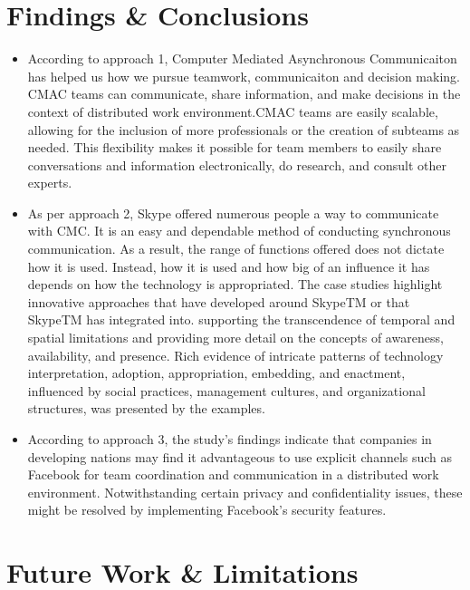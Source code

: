 \documentclass{llncs}
\begin{document}
\section{Findings \& Conclusions}

\begin{itemize}
    \item According to approach 1, Computer Mediated Asynchronous Communicaiton has helped us how we pursue teamwork, communicaiton and decision making. CMAC teams can communicate, share information, and make decisions in the context of distributed work environment.CMAC teams are easily scalable, allowing for the inclusion of more professionals or the creation of subteams as needed. This flexibility makes it possible for team members to easily share conversations and information electronically, do research, and consult other experts. ~\cite{refpaper5}\\
    \item As per approach 2, Skype offered numerous people a way to communicate with CMC. It is an easy and dependable method of conducting synchronous communication. As a result, the range of functions offered does not dictate how it is used. Instead, how it is used and how big of an influence it has depends on how the technology is appropriated. The case studies highlight innovative approaches that have developed around SkypeTM or that SkypeTM has integrated into. supporting the transcendence of temporal and spatial limitations and providing more detail on the concepts of awareness, availability, and presence. Rich evidence of intricate patterns of technology interpretation, adoption, appropriation, embedding, and enactment, influenced by social practices, management cultures, and organizational structures, was presented by the examples. ~\cite{refpaper7}\\
    \item According to approach 3, the study's findings indicate that companies in developing nations may find it advantageous to use explicit channels such as Facebook for team coordination and communication in a distributed work environment. Notwithstanding certain privacy and confidentiality issues, these might be resolved by implementing Facebook's security features. ~\cite{refpaper8}
\end{itemize}

\section{Future Work \& Limitations}
\end{document}
